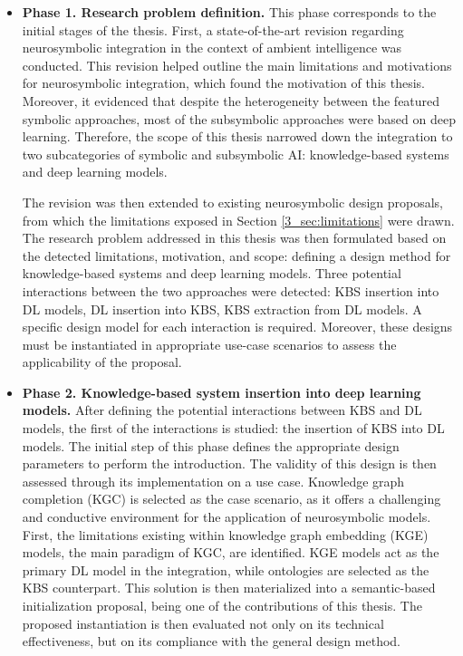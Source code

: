 \begin{itemize}
    \item \textbf{Phase 1. Research problem definition.} This phase corresponds to the initial stages of the thesis. First, a state-of-the-art revision regarding neurosymbolic integration in the context of ambient intelligence was conducted. This revision helped outline the main limitations and motivations for neurosymbolic integration, which found the motivation of this thesis. Moreover, it evidenced that despite the heterogeneity between the featured symbolic approaches, most of the subsymbolic approaches were based on deep learning. Therefore, the scope of this thesis narrowed down the integration to two subcategories of symbolic and subsymbolic AI: knowledge-based systems and deep learning models. 
    
    The revision was then extended to existing neurosymbolic design proposals, from which the limitations exposed in Section \ref{3_sec:limitations} were drawn. The research problem addressed in this thesis was then formulated based on the detected limitations, motivation, and scope: defining a design method for knowledge-based systems and deep learning models. Three potential interactions between the two approaches were detected: KBS insertion into DL models, DL insertion into KBS, KBS extraction from DL models. A specific design model for each interaction is required. Moreover, these designs must be instantiated in appropriate use-case scenarios to assess the applicability of the proposal.
    
    \item \textbf{Phase 2. Knowledge-based system insertion into deep learning models.} After defining the potential interactions between KBS and DL models, the first of the interactions is studied: the insertion of KBS into DL models. The initial step of this phase defines the appropriate design parameters to perform the introduction. The validity of this design is then assessed through its implementation on a use case. Knowledge graph completion (KGC) is selected as the case scenario, as it offers a challenging and conductive environment for the application of neurosymbolic models. First, the limitations existing within knowledge graph embedding (KGE) models, the main paradigm of KGC, are identified. KGE models act as the primary DL model in the integration, while ontologies are selected as the KBS counterpart. This solution is then materialized into a semantic-based initialization proposal, being one of the contributions of this thesis. The proposed instantiation is then evaluated not only on its technical effectiveness, but on its compliance with the general design method.
    

\end{itemize}
